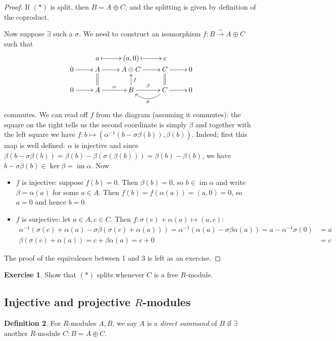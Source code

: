 \documentclass{article}
\newcommand{\im}{\operatorname{im}}
\theoremstyle{definition}
\newtheorem{defn}{Definition}[subsection]
\newtheorem{exe}[defn]{Exercise}
\begin{document}
\begin{proof}
If $(\ast)$ is split, then $B=A\oplus C$, and the splitting is given by definition of the coproduct.

Now suppose $\exists$ such a $\sigma$. We need to construct an isomorphism $f:B\xrightarrow{\sim}A\oplus C$ such that
\[
\xymatrix @R=.1pc{
& a\ar@{|->}[r] & (a,0)\ar@{|->}[r] & c\\
0\ar[r] & A\ar[r] & A\oplus C\ar[r] & C\ar[r] & 0 \\ \\ \\
0\ar[r] & A\ar[r]^\alpha\ar@{=}[uuu] & B\ar[r]^\beta\ar[uuu]_f & C\ar[r]\ar@{=}[uuu]\ar@/^1pc/[l]^\sigma & 0
}
\]
commutes. We can read off $f$ from the diagram (assuming it commutes): the square on the right tells us the second coordinate is simply $\beta$ and together with the left square we have $f:b\mapsto (\alpha^{-1}(b-\sigma\beta(b)),\beta(b))$. Indeed; first this map is well defined: $\alpha$ is injective and since $\beta(b-\sigma\beta(b))=\beta(b)-\beta(\sigma(\beta(b)))=\beta(b)-\beta(b)$, we have $b-\sigma\beta(b)\in\ker\beta=\im\alpha$. Now
\begin{itemize}
\item $f$ is injective: suppose $f(b)=0$. Then $\beta(b)=0$, so $b\in\im\alpha$ and write $\beta=\alpha(a)$ for some $a\in A$. Then $f(b)=f(\alpha(a))=(a,0)=0$, so $a=0$ and hence $b=0$.
\item $f$ is surjective: let $a\in A,c\in C$. Then $f:\sigma(c)+\alpha(a)\mapsto(a,c)$:
\[
\begin{aligned}
\alpha^{-1}(\sigma(c)+\alpha(a)-\sigma\beta(\sigma(c)+\alpha(a)))=\alpha^{-1}(\alpha(a)-\sigma\beta\alpha(a))=a-\alpha^{-1}\sigma(0)&=a \\
\beta(\sigma(c)+\alpha(a))=c+\beta\alpha(a)=c+0&=c
\end{aligned}
\]
\end{itemize}
The proof of the equivalence between 1 and 3 is left as an exercise.
\end{proof}

\begin{exe}
Show that $(\ast)$ splits whenever $C$ is a free $R$-module.
\end{exe}

\subsection{Injective and projective $R$-modules}
\begin{defn}
For $R$-modules $A,B$, we say $A$ is a \textit{direct summand} of $B$ if $\exists$ another $R$-module $C:B=A\oplus C$.
\end{defn}
\end{document}
